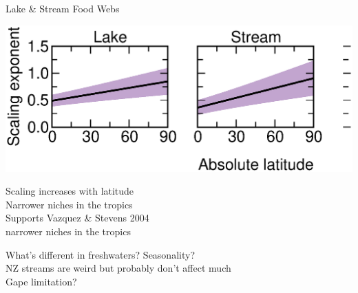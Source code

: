 \documentclass{beamer}
\begin{document}
  \begin{frame}{Lake \& Stream Food Webs}
    \begin{center}
      \includegraphics*[width=.75\textwidth]{Figures/results/effect.eps}

      \vspace{1cm}
      Scaling increases with latitude\\
      Narrower niches in the tropics\\
      \vspace{.54cm}
      Supports Vazquez \& Stevens 2004\\
      {\color{white} narrower niches in the tropics}

    \end{center}
  \end{frame}


  \begin{frame}{What's different in freshwaters?}
    Seasonality?\\
    NZ streams are weird but probably don't affect much\\
    Gape limitation?\\
  \end{frame}
\end{document}
